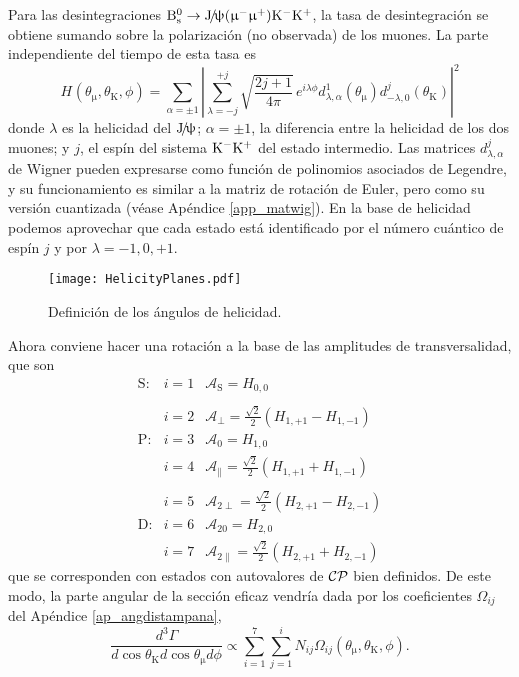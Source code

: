 Para las desintegraciones $\mathrm{B}{}_{\mathrm{s}}^{0} \rightarrow \mathrm{J}\!/\!\uppsi (\upmu{}^{-} \upmu{}^{+}) \mathrm{K}{}^{-} \mathrm{K}{}^{+}$, la tasa de desintegración se obtiene sumando sobre la polarización (no observada) de los muones. La parte independiente del tiempo de esta tasa es \cite{zhang2013time}
\begin{equation}
	H_{} (\theta_{\upmu},\theta_{\text{K}},\phi) = \sum_{\alpha = \pm 1} \left|\sum_{\lambda = -j}^{+j} \sqrt{\frac{2j+1}{4\pi}}\, e^{i \lambda \phi} d_{\lambda,\alpha}^{1}(\theta_{\upmu})
	d_{-\lambda,0}^{j}(\theta_{\text{K}}) \right|^2
\end{equation}
%
donde $\lambda$ es la helicidad del $\mathrm{J}\!/\!\uppsi$; $\alpha=\pm1$, la diferencia entre la helicidad de los dos muones; y $j$, el espín del sistema $\mathrm{K}{}^{-} \mathrm{K}{}^{+}$ del estado intermedio. 
%
Las matrices $d_{\lambda,\alpha}^{j}$ de Wigner pueden expresarse como función de polinomios asociados de Legendre, y su funcionamiento es similar a la matriz de rotación de Euler, pero como su versión cuantizada (véase Apéndice \ref{app_matwig}). En la base de helicidad podemos aprovechar que cada estado está identificado por el número cuántico de espín $j$ y por $\lambda = {-1,0,+1}$.

\begin{figure}[H]
\centering
\texttt{[image: HelicityPlanes.pdf]}
\caption{Definición de los ángulos de helicidad.} \label{fig_angdist}
\end{figure}


Ahora conviene hacer una rotación a la base de las amplitudes de transversalidad, que son
\begin{equation}
\begin{array}{ccl}
\text{S}:& i=1 & \mathcal{A}_{\text{S}} = H_{0,0} \\ \\
  & i=2 & \mathcal{A}_{\perp} = \frac{\sqrt{2}}{2} (H_{1,+1}-H_{1,-1})   \\
\text{P}:& i=3 & \mathcal{A}_{0} = H_{1,0} \\
  & i=4 & \mathcal{A}_{\parallel} = \frac{\sqrt{2}}{2} (H_{1,+1}+H_{1,-1}) \\ \\
  & i=5 & \mathcal{A}_{2\perp} = \frac{\sqrt{2}}{2} (H_{2,+1}-H_{2,-1}) \\
\text{D}:& i=6 & \mathcal{A}_{20} = H_{2,0} \\
  & i=7 & \mathcal{A}_{2\parallel} = \frac{\sqrt{2}}{2} (H_{2,+1}+H_{2,-1})  
\end{array}	\label{eq:amps}
\end{equation}
que se corresponden con estados con autovalores de $\mathcal{CP}$ bien definidos. De este modo, la parte angular de la sección eficaz vendría dada por los coeficientes $\Omega_{ij}$ del Apéndice \ref{ap_angdistampana},
\begin{equation}
\frac{d^3 \Gamma}{d\cos\theta_{\text{K}} d\cos\theta_{\upmu} d\phi} \propto \sum_{i=1}^{7}  \sum_{j=1}^i N_{ij} \Omega_{ij}(\theta_{\upmu},\theta_{\text{K}},\phi).
\end{equation}


